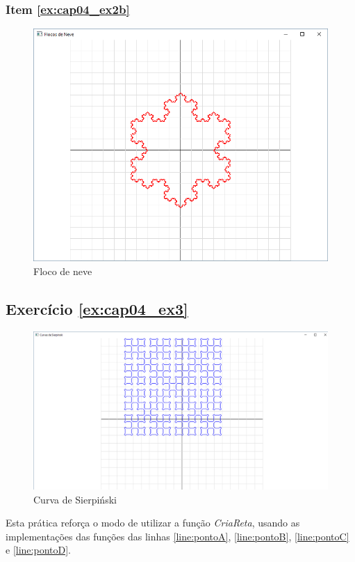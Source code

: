 \subsubsection*{Item \ref{ex:cap04_ex2b}}
\begin{figure}[ht]
  \centerline{\includegraphics[width=.5\textwidth]{img/cap4_ex15.png}}
  \caption{Floco de neve}
  \label{fig:cap04_ex2b}
\end{figure}



\subsection*{Exercício \ref{ex:cap04_ex3} }
\begin{figure}[ht]
  \centerline{\includegraphics[width=.5\textwidth]{img/cap4_ex16.png}}
  \caption{Curva de Sierpiński}
  \label{fig:cap04_ex3}
\end{figure}
Esta prática reforça o modo de utilizar a função \emph{CriaReta}, usando as implementações das funções das linhas \ref{line:pontoA}, \ref{line:pontoB}, \ref{line:pontoC} e \ref{line:pontoD}.
